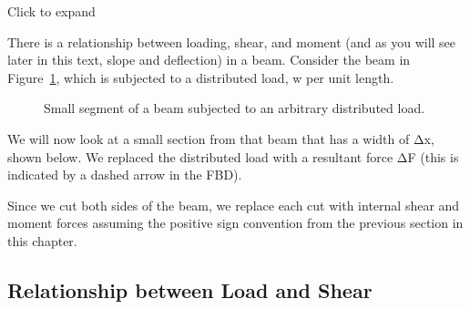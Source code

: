 \documentclass[
  letterpaper,
  DIV=11,
  numbers=noendperiod]{scrreprt}
\theoremstyle{definition}
\theoremstyle{remark}
\begin{document}
Click to expand

There is a relationship between loading, shear, and moment (and as you
will see later in this text, slope and deflection) in a beam. Consider
the beam in Figure~\ref{fig-7.3}, which is subjected to a distributed
load, w per unit length.

\begin{figure}


\caption{\label{fig-7.3}Small segment of a beam subjected to an
arbitrary distributed load.}

\end{figure}%

We will now look at a small section from that beam that has a width of
Δx, shown below. We replaced the distributed load with a resultant force
ΔF (this is indicated by a dashed arrow in the FBD).

Since we cut both sides of the beam, we replace each cut with internal
shear and moment forces assuming the positive sign convention from the
previous section in this chapter.

\subsection{Relationship between Load and
Shear}\label{relationship-between-load-and-shear}
\end{document}
